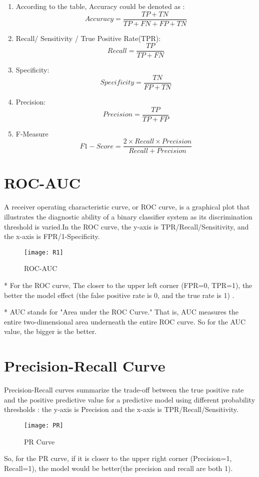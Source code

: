 \documentclass{article}
\begin{document}
\begin{enumerate}
    \item According to the table, Accuracy could be denoted as :
\[Accuracy = \frac{TP + TN}{TP + FN + FP + TN}\]

    \item Recall/ Sensitivity / True Positive Rate(TPR):
\[Recall = \frac{TP}{TP + FN}\]
    \item Specificity:
\[Specificity = \frac{TN}{FP + TN}\]
    \item Precision:
\[Precision = \frac{TP}{TP + FP}\]
    \item F-Measure
\[F1-Score = \frac{2 \times Recall \times Precision}{Recall + Precision}\]
\end{enumerate}

\section{ROC-AUC}
A receiver operating characteristic curve, or ROC curve, is a graphical plot that illustrates the diagnostic ability of a binary classifier system as its discrimination threshold is varied.In the ROC curve, the y-axis is TPR/Recall/Sensitivity, and the x-axis is FPR/1-Specificity.


\begin{figure}[htp]
    \centering
    \texttt{[image: R1]}
    \caption{ROC-AUC}
\end{figure}
* For the ROC curve, The closer to the upper left corner (FPR=0, TPR=1), the better the model effect (the false positive rate is 0, and the true rate is 1) .

* AUC stands for "Area under the ROC Curve." That is, AUC measures the entire two-dimensional area underneath the entire ROC curve. So for the AUC value, the bigger is the better.

\section{Precision-Recall Curve}
Precision-Recall curves summarize the trade-off between the true positive rate and the positive predictive value for a predictive model using different probability thresholds : the y-axis is Precision and the x-axis is TPR/Recall/Sensitivity. 
\begin{figure}[htp]
    \centering
    \texttt{[image: PR]}
    \caption{PR Curve}
\end{figure}

So, for the PR curve, if it is  closer to the upper right corner (Precision=1, Recall=1), the model would be better(the precision and recall are both 1).
\end{document}
